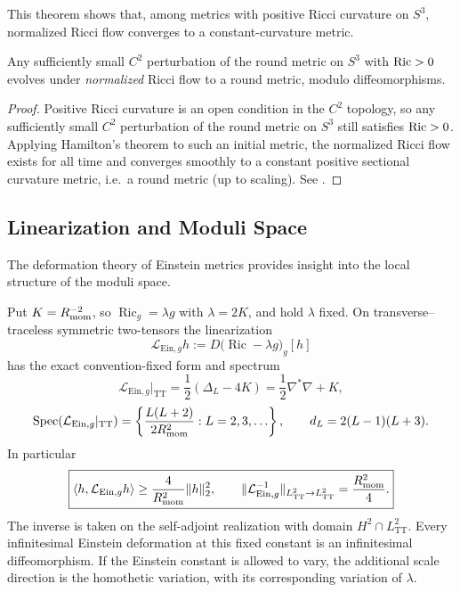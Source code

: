 \documentclass[11pt]{article}
\begin{document}
This theorem shows that, among metrics with positive Ricci curvature on \(S^3\), normalized Ricci flow converges to a constant-curvature metric.

\begin{corollary}
\label{p1:cor:ricci-flow-round-stability}
Any sufficiently small $C^2$ perturbation of the round metric on $S^3$ with $\operatorname{Ric}>0$ evolves under \emph{normalized} Ricci flow to a round metric, modulo diffeomorphisms.
\end{corollary}

\begin{proof}
Positive Ricci curvature is an open condition in the $C^2$ topology, so any sufficiently small $C^2$ perturbation of the round metric on $S^3$ still satisfies $\operatorname{Ric}>0$. Applying Hamilton’s theorem \cite{Hamilton1982} to such an initial metric, the normalized Ricci flow exists for all time and converges smoothly to a constant positive sectional curvature metric, i.e.\ a round metric (up to scaling). See \cite{Hamilton1982}.
\end{proof}


\subsection{Linearization and Moduli Space}

The deformation theory of Einstein metrics provides insight into the local structure of the moduli space.

\begin{proposition}
\label{p1:prop:infinitesimal-einstein-deformations}
Put \(K=R_{\mathrm{mom}}^{-2}\), so \(\operatorname{Ric}_g=\lambda g\) with
\(\lambda=2K\), and hold \(\lambda\) fixed.  On transverse--traceless
symmetric two-tensors the linearization
\[
 \mathcal L_{\mathrm{Ein},g}h
 :=D\bigl(\operatorname{Ric}-\lambda g\bigr)_g[h]
\]
has the exact convention-fixed form and spectrum
\[
 \boxed{
 \mathcal L_{\mathrm{Ein},g}|_{\mathrm{TT}}
 =\frac12(\Delta_L-4K)
 =\frac12\nabla^*\nabla+K,}
\]
\[
 \operatorname{Spec}(\mathcal L_{\mathrm{Ein},g}|_{\mathrm{TT}})
 =\left\{\frac{L(L+2)}{2R_{\mathrm{mom}}^2}:L=2,3,\ldots\right\},
 \qquad d_L=2(L-1)(L+3).
\]
In particular
\[
 \boxed{
 \langle h,\mathcal L_{\mathrm{Ein},g}h\rangle
 \ge\frac4{R_{\mathrm{mom}}^2}\|h\|_2^2,\qquad
 \|\mathcal L_{\mathrm{Ein},g}^{-1}\|_{L^2_{\mathrm{TT}}\to L^2_{\mathrm{TT}}}
 =\frac{R_{\mathrm{mom}}^2}{4}.}
\]
The inverse is taken on the self-adjoint realization with domain
\(H^2\cap L^2_{\mathrm{TT}}\).  Every infinitesimal Einstein deformation
at this fixed constant is an infinitesimal diffeomorphism.  If the Einstein
constant is allowed to vary, the additional scale direction is the
homothetic variation, with its corresponding variation of \(\lambda\).
\end{proposition}
\end{document}
